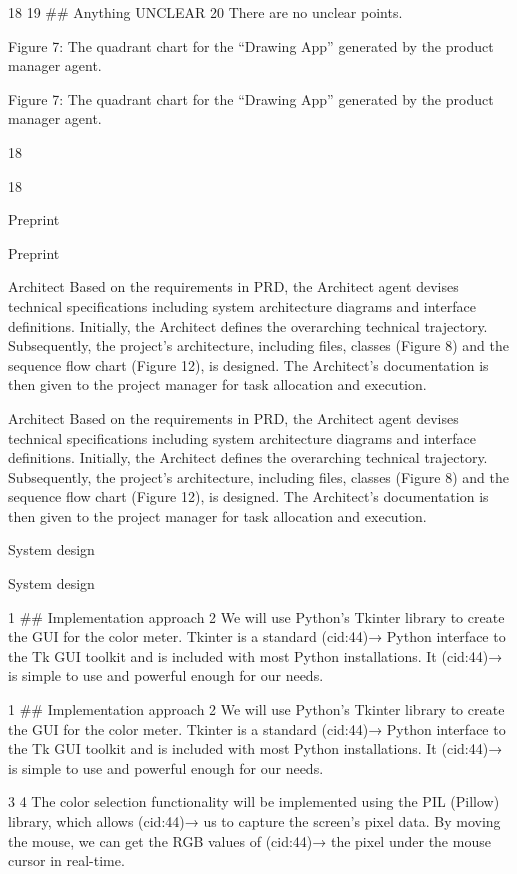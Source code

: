 \documentclass[12pt]{article}
\begin{document}
18
19 \#\# Anything UNCLEAR
20 There are no unclear points.


Figure 7: The quadrant chart for the “Drawing App” generated by the product manager agent.


Figure 7: The quadrant chart for the “Drawing App” generated by the product manager agent.


18


18


Preprint


Preprint


Architect Based on the requirements in PRD, the Architect agent devises technical specifications
including system architecture diagrams and interface definitions. Initially, the Architect defines the
overarching technical trajectory. Subsequently, the project’s architecture, including files, classes
(Figure 8) and the sequence flow chart (Figure 12), is designed. The Architect’s documentation is
then given to the project manager for task allocation and execution.


Architect Based on the requirements in PRD, the Architect agent devises technical specifications
including system architecture diagrams and interface definitions. Initially, the Architect defines the
overarching technical trajectory. Subsequently, the project’s architecture, including files, classes
(Figure 8) and the sequence flow chart (Figure 12), is designed. The Architect’s documentation is
then given to the project manager for task allocation and execution.


System design


System design


1 ## Implementation approach
2 We will use Python’s Tkinter library to create the GUI for the color meter. Tkinter is a standard
(cid:44)→ Python interface to the Tk GUI toolkit and is included with most Python installations. It
(cid:44)→ is simple to use and powerful enough for our needs.


1 \#\# Implementation approach
2 We will use Python’s Tkinter library to create the GUI for the color meter. Tkinter is a standard
(cid:44)→ Python interface to the Tk GUI toolkit and is included with most Python installations. It
(cid:44)→ is simple to use and powerful enough for our needs.


3
4 The color selection functionality will be implemented using the PIL (Pillow) library, which allows
(cid:44)→ us to capture the screen’s pixel data. By moving the mouse, we can get the RGB values of
(cid:44)→ the pixel under the mouse cursor in real-time.
\end{document}
